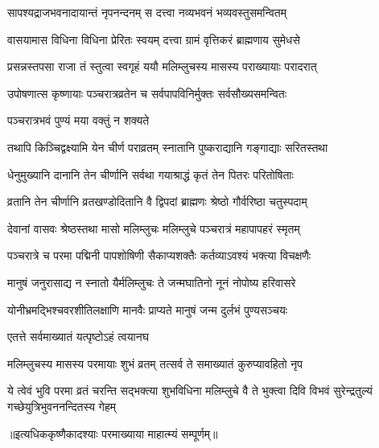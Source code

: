 \twolineshloka
{सापश्यद्राजभवनादायान्तं नृपनन्दनम्}
{स दत्त्वा नव्यभवनं भव्यवस्तुसमन्वितम्} %

\twolineshloka
{वासयामास विधिना विधिना प्रेरितः स्वयम्}
{दत्त्वा ग्रामं वृत्तिकरं ब्राह्मणाय सुमेधसे} %

\twolineshloka
{प्रसन्नस्तपसा राजा तं स्तुत्वा स्वगृहं ययौ}
{मलिम्लुचस्य मासस्य पराख्यायाः परादरात्} %

\twolineshloka
{उपोषणात्स कृष्णायाः पञ्चरात्रव्रतेन च}
{सर्वपापविनिर्मुक्तः सर्वसौख्यसमन्वितः} %



\onelineshloka
{पञ्चरात्रभवं पुण्यं मया वक्तुं न शक्यते} %

\twolineshloka
{तथापि किञ्चिद्वक्ष्यामि येन चीर्ण पराव्रतम्}
{स्नातानि पुष्कराद्यानि गङ्गाद्याः सरितस्तथा} %

\twolineshloka
{धेनुमुख्यानि दानानि तेन चीर्णानि सर्वथा}
{गयाश्राद्धं कृतं तेन पितरः परितोषिताः} %

\twolineshloka
{व्रतानि तेन चीर्णानि व्रतखण्डोदितानि वै}
{द्विपदां ब्राह्मणः श्रेष्ठो गौर्वरिष्ठा चतुस्पदाम्} %

\twolineshloka
{देवानां वासवः श्रेष्ठस्तथा मासो मलिम्लुचः}
{मलिम्लुचे पञ्चरात्रं महापापहरं स्मृतम्} %

\twolineshloka
{पञ्चरात्रे च परमा पद्मिनी पापशोषिणी}
{सैकाप्यशक्तैः कर्तव्याऽवश्यं भक्त्या विचक्षणैः} %

\twolineshloka
{मानुषं जनुरासाद्य न स्नातो यैर्मलिम्लुचः}
{ते जन्मघातिनो नूनं नोपोष्य हरिवासरे} %

\twolineshloka
{योनीभ्रमद्भिश्चवरशीतिलक्षाणि मानवैः}
{प्राप्यते मानुषं जन्म दुर्लभं पुण्यसञ्चयः} %



\onelineshloka
{एतत्ते सर्वमाख्यातं यत्पृष्टोऽहं त्वयानघ} %

\twolineshloka
{मलिम्लुचस्य मासस्य परमायाः शुभं व्रतम्}
{तत्सर्व ते समाख्यातं कुरुप्यावहितो नृप} %

\twolineshloka
{ये त्वेवं भुवि परमा व्रतं चरन्ति सद्भक्त्या शुभविधिना मलिम्लुचे वै}
{ते भुक्त्वा दिवि विभवं सुरेन्द्रतुल्यं गच्छेयुत्रिभुवननन्दितस्य गेहम्} %

॥इत्यधिककृष्णैकादश्याः परमाख्याया माहात्म्यं सम्पूर्णम्॥
